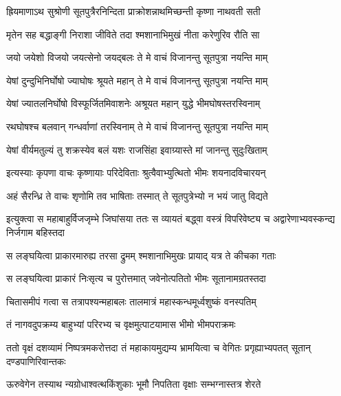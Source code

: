 \twolineshloka
{ह्रियमाणाऽथ सुश्रोणी सूतपुत्रैरनिन्दिता}
{प्राक्रोशन्नाथमिच्छन्ती कृष्णा नाथवती सती}


\twolineshloka
{मृतेन सह बद्धाङ्गी निराशा जीविते तदा}
{श्मशानाभिमुखं नीता करेणुरिव रौति सा}




\twolineshloka
{जयो जयेशो विजयो जयत्सेनो जयद्बलः}
{ते मे वाचं विजानन्तु सूतपुत्रा नयन्ति माम्}


\twolineshloka
{येषां दुन्दुभिनिर्घोषो ज्याघोषः श्रूयते महान्}
{ते मे वाचं विजानन्तु सूतपुत्रा नयन्ति माम्}


\twolineshloka
{येषां ज्यातलनिर्घोषो विस्फूर्जितमिवाशनेः}
{अश्रूयत महान् युद्धे भीमघोषस्तरस्विनाम्}


\twolineshloka
{रथघोषश्च बलवान् गन्धर्वाणां तरस्विनाम्}
{ते मे वाचं विजानन्तु सूतपुत्रा नयन्ति माम्}


\twolineshloka
{येषां वीर्यमतुल्यं तु शक्रस्येव बलं यशः}
{राजसिंहा इवाग्र्यास्ते मां जानन्तु सुदुःखिताम्}


\twolineshloka
{इत्यस्याः कृपणा वाचः कृष्णायाः परिदेविताः}
{श्रुत्वैवाभ्युत्थितो भीमः शयनादविचारयन्}




\twolineshloka
{अहं सैरन्ध्रि ते वाचः शृणोमि तव भाषिताः}
{तस्मात् ते सूतपुत्रेभ्यो न भयं जातु विद्यते}



\onelineshloka
{इत्युक्त्वा स महाबाहुर्विजजृम्भे जिघांसया}
\twolineshloka
{ततः स व्यायतं बद्ध्वा वस्त्रं विपरिवेष्ट्य च}
{अद्वारेणाभ्यवस्कन्द्य निर्जगाम बहिस्तदा}


\twolineshloka
{स लङ्घयित्वा प्राकारमारुह्य तरसा द्रुमम्}
{श्मशानाभिमुखः प्रायाद् यत्र ते कीचका गताः}


\twolineshloka
{स लङ्घयित्वा प्राकारं निःसृत्य च पुरोत्तमात्}
{जवेनोत्पतितो भीमः सूतानामग्रतस्तदा}


\twolineshloka
{चितासमीपं गत्वा स तत्रापश्यन्महाबलः}
{तालमात्रं महास्कन्धमूर्ध्वशुष्कं वनस्पतिम्}


\twolineshloka
{तं नागवदुपक्रम्य बाहुभ्यां परिरभ्य च}
{वृक्षमुत्पाटयामास भीमो भीमपराक्रमः}


\onelineshloka
{ततो वृक्षं दशव्यामं निष्पत्रमकरोत्तदा}
\twolineshloka
{तं महाकायमुद्यम्य भ्रामयित्वा च वेगितः}
{प्रगृह्याभ्यपतत् सूतान् दण्डपाणिरिवान्तकः}


\twolineshloka
{ऊरुवेगेन तस्याथ न्यग्रोधाश्वत्थकिंशुकाः}
{भूमौ निपतिता वृक्षाः सम्भग्नास्तत्र शेरते}


